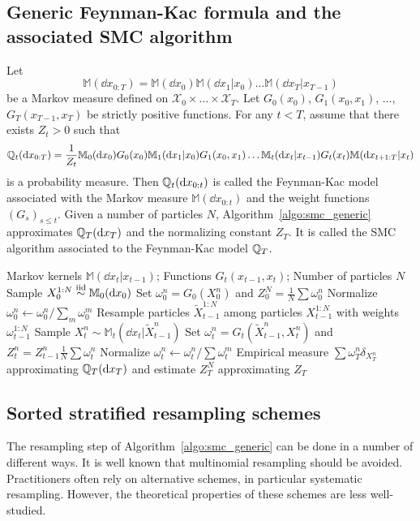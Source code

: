 \documentclass{article}
\theoremstyle{plain}
\theoremstyle{definition}
\theoremstyle{remark}
\begin{document}
\subsection{Generic Feynman-Kac formula and the associated SMC algorithm}
\label{sec:fk_general}
\newcommand{\M}{\mathbb M}
Let
\begin{equation*}
	\M(\dd x_{0:T}) = \M(\dd x_0) \M(\dd x_1|x_0) \ldots \M(\dd x_T|x_{T-1})
\end{equation*} be a Markov measure defined on $\mathcal X_0 \times \ldots \times \mathcal X_T$. Let $G_0(x_0)$, $G_1(x_0, x_1)$, $\ldots$, $G_T(x_{T-1}, x_T)$ be strictly positive functions. For any $t<T$, assume that there exists $Z_t>0$ such that
\begin{equation*}
	\Q_t(\dd x_{0:T}) = \frac{1}{Z_t} \M_0(\dd x_0) G_0(x_0) \M_1(\dd x_1|x_0) G_1(x_0, x_1) \ldots \M_t(\dd x_t|x_{t-1}) G_t(x_t) \M(\dd x_{t+1:T}|x_t)
\end{equation*}
is a probability measure. Then $\mathbb{Q}_t(\dd x_{0:t})$ is called the Feynman-Kac model associated with the Markov measure $\M(\dd x_{0:t})$ and the weight functions $(G_s)_{s\leq t}$. Given a number of particles $N$, Algorithm~\ref{algo:smc_generic} approximates $\mathbb{Q}_T(\dd x_T)$ and the normalizing constant $Z_T$. It is called the SMC algorithm associated to the Feynman-Kac model $\mathbb{Q}_T$.

\begin{algorithm}
	\begin{algorithmic}
		\caption{Generic SMC algorithm}
		\label{algo:smc_generic}
		\REQUIRE Markov kernels $\M(\dd x_t|x_{t-1})$; Functions $G_t(x_{t-1}, x_t)$; Number of particles $N$
		\STATE Sample $X_0^{1:N} \simiid \M_0(\dd x_0)$
		\STATE Set $\omega_0^n = G_0(X_0^n)$ and $Z_0^N = \frac 1N \sum \omega_0^n$
		\STATE Normalize $\omega_0^n \gets \omega_0^n/\sum_m \omega_0^m$
		\STATE Resample particles $\tilde X_{t-1}^{1:N}$ among particles $X_{t-1}^{1:N}$ with weights $\omega_{t-1}^{1:N}$
		\STATE Sample $X_t^n \sim \M_t(\dd x_t|\tilde X_{t-1}^n)$
		\STATE Set $\omega_t^n = G_t(\tilde X_{t-1}^n, X_t^n)$ and $Z_t^n = Z_{t-1}^n \frac 1N \sum \omega_t^n$
		\STATE Normalize $\omega_t^n \gets \omega_t^n/\sum \omega_t^m$
		\ENDFOR
		\ENSURE Empirical measure $\sum \omega_T^n \delta_{X_T^n}$ approximating $\mathbb{Q}_T(\dd x_T)$ and estimate $Z_T^N$ approximating $Z_T$
	\end{algorithmic}
\end{algorithm}

\subsection{Sorted stratified resampling schemes}
The resampling step of Algorithm~\ref{algo:smc_generic} can be done in a number of different ways. It is well known that multinomial resampling should be avoided. Practitioners often rely on alternative schemes, in particular systematic resampling. However, the theoretical properties of these schemes are less well-studied.
\end{document}
